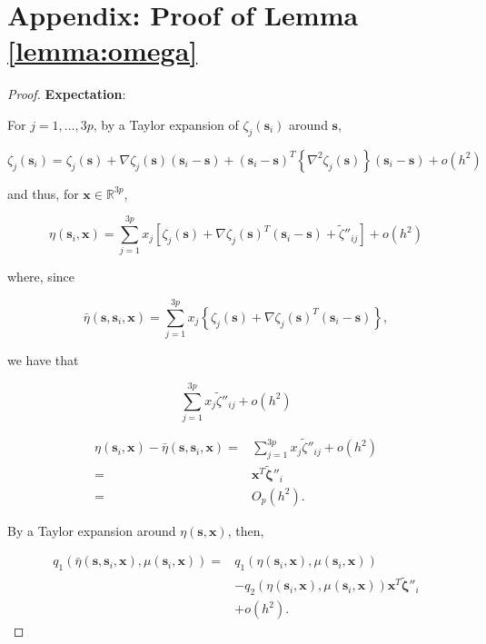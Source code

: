 \documentclass[12pt,english,authoryear, review]{article}\usepackage[]{graphicx}\usepackage[]{color}
\theoremstyle{plain}
\theoremstyle{plain}
\begin{document}
\section*{Appendix: Proof of Lemma \ref{lemma:omega}}
\begin{proof}
\textbf{Expectation}:

For $j=1,\dots,3p$, by a Taylor expansion of $\zeta_{j}\left(\bm{s}_{i}\right)$
around $\bm{s}$,

\[
\zeta_{j}\left(\bm{s}_{i}\right)=\zeta_{j}\left(\bm{s}\right)+\nabla\zeta_{j}\left(\bm{s}\right)\left(\bm{s}_{i}-\bm{s}\right)+\left(\bm{s}_{i}-\bm{s}\right)^{T}\left\{ \nabla^{2}\zeta_{j}\left(\bm{s}\right)\right\} \left(\bm{s}_{i}-\bm{s}\right)+o\left(h^{2}\right)
\]


and thus, for $\bm{x}\in\mathbb{R}^{3p}$, 

\[
\eta\left(\bm{s}_{i},\bm{x}\right)=\sum_{j=1}^{3p}x_{j}\left[\zeta_{j}\left(\bm{s}\right)+\nabla\zeta_{j}\left(\bm{s}\right)^{T}\left(\bm{s}_{i}-\bm{s}\right)+\tilde{\zeta}''_{ij}\right]+o\left(h^{2}\right)
\]


where, since 

\[
\bar{\eta}\left(\bm{s},\bm{s}_{i},\bm{x}\right)=\sum_{j=1}^{3p}x_{j}\left\{ \zeta_{j}\left(\bm{s}\right)+\nabla\zeta_{j}\left(\bm{s}\right)^{T}\left(\bm{s}_{i}-\bm{s}\right)\right\} ,
\]


we have that 

\[
\sum_{j=1}^{3p}x_{j}\tilde{\zeta}''_{ij}+o\left(h^{2}\right)
\]


\begin{align*}
\eta\left(\bm{s}_{i},\bm{x}\right)-\bar{\eta}\left(\bm{s},\bm{s}_{i},\bm{x}\right)= & \sum_{j=1}^{3p}x_{j}\tilde{\zeta}''_{ij}+o\left(h^{2}\right)\\
= & \bm{x}^{T}\tilde{\bm{\zeta}}''_{i}\\
= & O_{p}\left(h^{2}\right).
\end{align*}


By a Taylor expansion around $\eta\left(\bm{s},\bm{x}\right)$, then, 

\begin{align*}
q_{1}\left(\bar{\eta}\left(\bm{s},\bm{s}_{i},\bm{x}\right),\mu\left(\bm{s}_{i},\bm{x}\right)\right)= & q_{1}\left(\eta\left(\bm{s}_{i},\bm{x}\right),\mu\left(\bm{s}_{i},\bm{x}\right)\right)\\
 & -q_{2}\left(\eta\left(\bm{s}_{i},\bm{x}\right),\mu\left(\bm{s}_{i},\bm{x}\right)\right)\bm{x}^{T}\tilde{\bm{\zeta}}''_{i}\\
 & +o\left(h^{2}\right).
\end{align*}



\end{proof}
\end{document}
